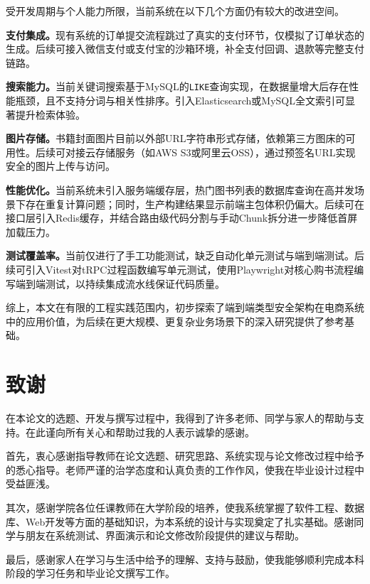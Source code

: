 \documentclass[12pt,a4paper]{ctexart}
\begin{document}
受开发周期与个人能力所限，当前系统在以下几个方面仍有较大的改进空间。

\textbf{支付集成。}现有系统的订单提交流程跳过了真实的支付环节，仅模拟了订单状态的生成。后续可接入微信支付或支付宝的沙箱环境，补全支付回调、退款等完整支付链路。

\textbf{搜索能力。}当前关键词搜索基于MySQL的\texttt{LIKE}查询实现，在数据量增大后存在性能瓶颈，且不支持分词与相关性排序。引入Elasticsearch或MySQL全文索引可显著提升检索体验。

\textbf{图片存储。}书籍封面图片目前以外部URL字符串形式存储，依赖第三方图床的可用性。后续可对接云存储服务（如AWS S3或阿里云OSS），通过预签名URL实现安全的图片上传与访问。

\textbf{性能优化。}当前系统未引入服务端缓存层，热门图书列表的数据库查询在高并发场景下存在重复计算问题；同时，生产构建结果显示前端主包体积仍偏大。后续可在接口层引入Redis缓存，并结合路由级代码分割与手动Chunk拆分进一步降低首屏加载压力。

\textbf{测试覆盖率。}当前仅进行了手工功能测试，缺乏自动化单元测试与端到端测试。后续可引入Vitest对tRPC过程函数编写单元测试，使用Playwright对核心购书流程编写端到端测试，以持续集成流水线保证代码质量。

综上，本文在有限的工程实践范围内，初步探索了端到端类型安全架构在电商系统中的应用价值，为后续在更大规模、更复杂业务场景下的深入研究提供了参考基础。

\newpage
\section*{致谢}

在本论文的选题、开发与撰写过程中，我得到了许多老师、同学与家人的帮助与支持。在此谨向所有关心和帮助过我的人表示诚挚的感谢。

首先，衷心感谢指导教师在论文选题、研究思路、系统实现与论文修改过程中给予的悉心指导。老师严谨的治学态度和认真负责的工作作风，使我在毕业设计过程中受益匪浅。

其次，感谢学院各位任课教师在大学阶段的培养，使我系统掌握了软件工程、数据库、Web开发等方面的基础知识，为本系统的设计与实现奠定了扎实基础。感谢同学与朋友在系统测试、界面演示和论文修改阶段提供的建议与帮助。

最后，感谢家人在学习与生活中给予的理解、支持与鼓励，使我能够顺利完成本科阶段的学习任务和毕业论文撰写工作。

\newpage
\end{document}
